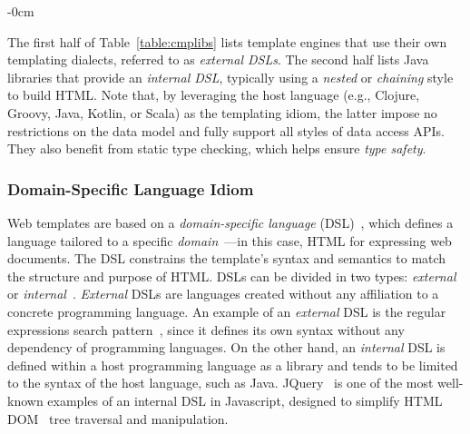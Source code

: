 \documentclass[software,article,accept,pdftex,moreauthors]{Definitions/mdpi}
\begin{document}
\begin{table}[H]
\begin{adjustwidth}{-\extralength}{0cm}
\end{adjustwidth}
  \label{table:cmplibs}
\end{table}

The first half of Table~\ref{table:cmplibs} lists template engines that use
their own templating dialects, referred to as \textit{external DSLs}. The
second half lists Java libraries that provide an \textit{internal DSL},
typically using a \textit{nested} or \textit{chaining} style to build HTML.
Note that, by leveraging the host language (e.g., Clojure, Groovy, Java,
Kotlin, or Scala) as the templating idiom, the latter impose no restrictions on
the data model and fully support all styles of data access APIs. They also
benefit from static type checking, which helps ensure \textit{type safety}.


\subsubsection{Domain-Specific Language Idiom}\label{s2.1.1}

Web templates are based on a \textit{domain-specific language}
(DSL)~\cite{landin1966next}, which defines a language tailored to a specific
\textit{domain}~\cite{evans2004domain}---in this case, HTML for expressing web
documents. The DSL constrains the template's syntax and semantics to match the
structure and purpose of HTML.
DSLs can be divided in two types: \textit{external} or
\textit{internal}~\cite{Fowler03}. \textit{External} DSLs are languages created
without any affiliation to a concrete programming language. An example of an
\textit{external} DSL is the regular expressions search
pattern~\cite{thompson1968}, since it defines its own syntax without any
dependency of programming languages. On the other hand, an \textit{internal} DSL
is defined within a host programming language as a library and tends to be
limited to the syntax of the host language, such as Java.
JQuery~\cite{resig2007pro} is one of the most well-known examples of an internal
DSL in Javascript, designed to simplify HTML DOM~\cite{dom} tree traversal and
manipulation.
\end{document}
